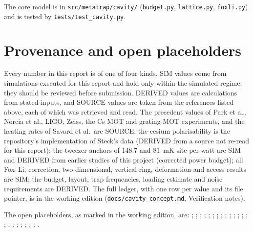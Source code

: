 \documentclass[11pt]{article}
\begin{document}
The core model is in \texttt{src/metatrap/cavity/} (\texttt{budget.py}, \texttt{lattice.py},
\texttt{foxli.py}) and is tested by \texttt{tests/test\_cavity.py}.

\section{Provenance and open placeholders}
\label{app:provenance}

Every number in this report is of one of four kinds. SIM values come from simulations executed for
this report and hold only within the simulated regime; they should be reviewed before submission.
DERIVED values are calculations from stated inputs, and SOURCE values are taken from the references
listed above, each of which was retrieved and read. The precedent values of Park et al., Norcia et al.,
LIGO, Zeiss, the Cs MOT and grating-MOT experiments, and the heating rates of Savard et al.\ are SOURCE;
the cesium polarisability is the repository's implementation of Steck's data (DERIVED from a source not
re-read for this report); the tweezer anchors of 148.7 and \SI{81}{\milli\kelvin} site per watt are SIM
and DERIVED from earlier studies of this project (corrected power budget); all Fox--Li, correction, two-dimensional, vertical-ring,
deformation and access results are SIM; the budget, layout, trap frequencies, loading estimate and noise
requirements are DERIVED. The full ledger, with one row per value and its file pointer, is in the
working edition (\texttt{docs/cavity\_concept.md}, Verification notes).

{\raggedright The open placeholders, as marked in the working edition, are: ; ; ; ; ; ; ; ; ; ; ; ; ; ; ; ; ; ; ; ; ; ; .\par}
\end{document}
